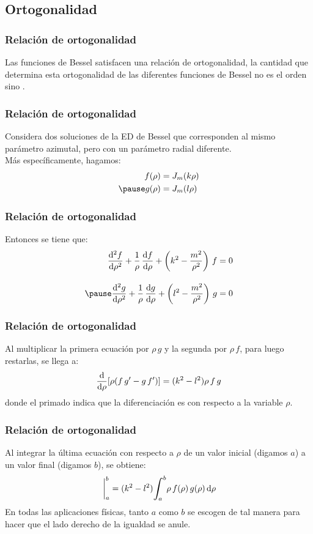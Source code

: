 \documentclass[12pt]{beamer}
\begin{document}
\subsection{Ortogonalidad}

\begin{frame}
\frametitle{Relación de ortogonalidad}
Las funciones de Bessel satisfacen una relación de ortogonalidad, \pause la cantidad que determina esta ortogonalidad de las diferentes funciones de Bessel no es el orden sino .
\end{frame}
\begin{frame}
\frametitle{Relación de ortogonalidad}
Considera dos soluciones de la ED de Bessel que corresponden al mismo parámetro azimutal, \pause pero con un parámetro radial diferente.
\\
\bigskip
\pause
Más específicamente, hagamos:
\pause
\begin{eqnarray*}
f(\rho) &= J_{m} (k \rho) \\ \pause
g(\rho) &= J_{m} (l \rho)
\end{eqnarray*}
\end{frame}
\begin{frame}
\frametitle{Relación de ortogonalidad}
Entonces se tiene que:
\pause
\begin{eqnarray*}
\dv[2]{f}{\rho} + \dfrac{1}{\rho} \, \dv{f}{\rho} + \left( k^{2} - \dfrac{m^{2}}{\rho^{2}} \right) \, f &= 0 \\[1em] \pause
\dv[2]{g}{\rho} + \dfrac{1}{\rho} \, \dv{g}{\rho} + \left( l^{2} - \dfrac{m^{2}}{\rho^{2}} \right) \, g &= 0
\end{eqnarray*}
\end{frame}
\begin{frame}
\frametitle{Relación de ortogonalidad}
Al multiplicar la primera ecuación por $\rho \, g$ y la segunda por $\rho \, f$, para luego restarlas, se llega a:
\pause
\begin{align*}
\dv{\rho} [\rho (f \, g^{\prime} - g \, f^{\prime} ) ] = (k^{2} - l^{2}) \rho \, f \, g
\end{align*}
donde el primado indica que la diferenciación es con respecto a la variable $\rho$.
\end{frame}
\begin{frame}
\frametitle{Relación de ortogonalidad}
Al integrar la última ecuación con respecto a $\rho$ de un valor inicial (digamos $a$) a un valor final (digamos $b$), se obtiene:
\pause
\begin{align*}
[\rho (f \, g^{\prime} - g \, f^{\prime} ) ]\eval_{a}^{b} = (k^{2} - l^{2}) \scaleint{6ex}_{\bs a}^{b} \rho \, f(\rho) \, g(\rho) \dd{\rho}
\end{align*}
\pause
En todas las aplicaciones físicas, tanto $a$ como $b$ se escogen de tal manera para hacer que el lado derecho de la igualdad se anule.
\end{frame}
\end{document}
